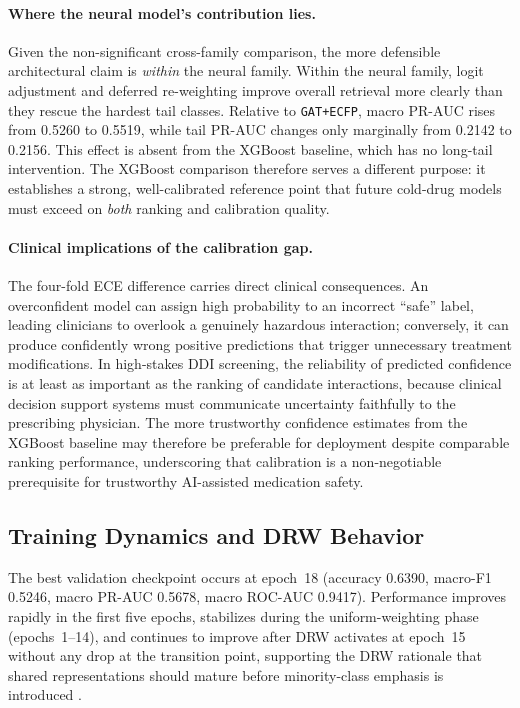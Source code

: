 \documentclass[11pt,a4paper,twocolumn]{article}
\begin{document}
\paragraph{Where the neural model's contribution lies.}
Given the non-significant cross-family comparison, the more defensible
architectural claim is \emph{within} the neural family.
Within the neural family, logit adjustment and deferred re-weighting improve
overall retrieval more clearly than they rescue the hardest tail classes.
Relative to \texttt{GAT+ECFP}, macro PR-AUC rises from 0.5260 to 0.5519,
while tail PR-AUC changes only marginally from 0.2142 to 0.2156.
This effect is absent from the XGBoost baseline, which has
no long-tail intervention.
The XGBoost comparison therefore serves a different purpose: it establishes a
strong, well-calibrated reference point that future cold-drug models must
exceed on \emph{both} ranking and calibration quality.

\paragraph{Clinical implications of the calibration gap.}
The four-fold ECE difference carries direct clinical consequences.
An overconfident model can assign high probability to an incorrect ``safe''
label, leading clinicians to overlook a genuinely hazardous interaction;
conversely, it can produce confidently wrong positive predictions that trigger
unnecessary treatment modifications.
In high-stakes DDI screening, the reliability of predicted confidence is at
least as important as the ranking of candidate interactions, because clinical
decision support systems must communicate uncertainty faithfully to the
prescribing physician.
The more trustworthy confidence estimates from the XGBoost baseline may
therefore be preferable for deployment despite comparable ranking performance,
underscoring that calibration is a non-negotiable prerequisite for trustworthy
AI-assisted medication safety.

\subsection{Training Dynamics and DRW Behavior}
The best validation checkpoint occurs at epoch~18 (accuracy 0.6390, macro-F1 0.5246,
macro PR-AUC 0.5678, macro ROC-AUC 0.9417).
Performance improves rapidly in the first five epochs, stabilizes during the
uniform-weighting phase (epochs~1--14), and continues to improve after DRW activates
at epoch~15 without any drop at the transition point, supporting the DRW rationale
that shared representations should mature before minority-class emphasis is introduced
\cite{cao2019ldam}.
\end{document}
